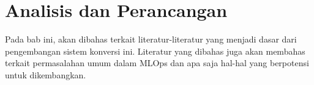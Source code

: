 \clearpage
\chapter{Analisis dan Perancangan}\label{chap:3}

Pada bab ini, akan dibahas terkait literatur-literatur yang menjadi dasar dari pengembangan sistem konversi ini.
Literatur yang dibahas juga akan membahas terkait permasalahan umum dalam MLOps dan apa saja hal-hal yang berpotensi untuk dikembangkan.



